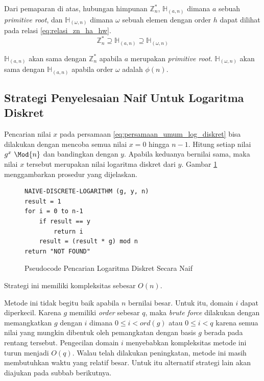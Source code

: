 Dari pemaparan di atas, hubungan himpunan $ \mathbb{Z}_n^* $, $ \mathbb{H}_{(a, n)} $ dimana $ a $ sebuah \textit{primitive root}, dan $ \mathbb{H}_{(\omega, n)} $ dimana $ \omega $ sebuah elemen dengan order $ h $ dapat dilihat pada relasi \eqref{eq:relasi_zn_ha_hw}.
\begin{equation}
\mathbb{Z}_n^*\supseteq \mathbb{H}_{(a, n)} \supseteq \mathbb{H}_{(\omega, n)}
\label{eq:relasi_zn_ha_hw}
\end{equation}

$ \mathbb{H}_{(a, n)} $ akan sama dengan $ \mathbb{Z}_n^* $ apabila $ a $ merupakan \textit{primitive root}. $ \mathbb{H}_{(\omega, n)} $ akan sama dengan $ \mathbb{H}_{(a, n)} $ apabila order $ {\omega} $ adalah $ \phi(n) $.

\subsection{Strategi Penyelesaian Naif Untuk Logaritma Diskret}
Pencarian nilai $ x $ pada persamaan \eqref{eq:persamaan_umum_log_diskret} bisa dilakukan dengan mencoba semua nilai $ x = 0 $ hingga $ n-1 $. Hitung setiap nilai $ g^x\ \Mod{n} $ dan bandingkan dengan $ y $. Apabila keduanya bernilai sama, maka nilai $ x $ tersebut merupakan nilai logaritma diskret dari $ y $. Gambar \ref{psdo:disc_log_naive} menggambarkan prosedur yang dijelaskan.
\begin{figure}[h!]
\begin{lstlisting}[firstnumber=0]
NAIVE-DISCRETE-LOGARITHM (g, y, n)
result = 1
for i = 0 to n-1
	if result == y
		return i
	result = (result * g) mod n
return "NOT FOUND"
\end{lstlisting}
\caption{Pseudocode Pencarian Logaritma Diskret Secara Naif}
\label{psdo:disc_log_naive}
\end{figure}
Strategi ini memiliki kompleksitas sebesar $ O(n) $.

Metode ini tidak begitu baik apabila $ n $ bernilai besar. Untuk itu, domain $ i $ dapat diperkecil. Karena $ g $ memiliki \textit{order} sebesar $ q $, maka \textit{brute force} dilakukan dengan memangkatkan $ g $ dengan $ i $ dimana $ 0\leq i < ord(g) $ atau $ 0 \leq i < q $ karena semua nilai yang mungkin dibentuk oleh pemangkatan dengan basis $ g $ berada pada rentang tersebut. Pengecilan domain $ i $ menyebabkan kompleksitas metode ini turun menjadi $ O(q) $. Walau telah dilakukan peningkatan, metode ini masih membutuhkan waktu yang relatif besar. Untuk itu alternatif strategi lain akan diajukan pada subbab berikutnya.

